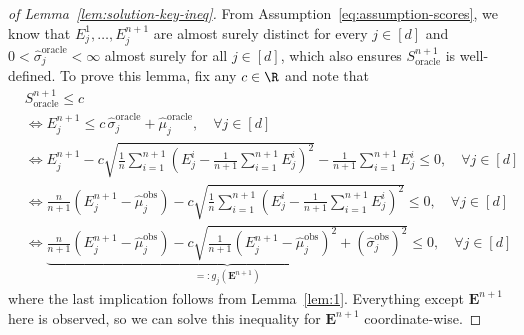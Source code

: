 \begin{proof}[of Lemma~\ref{lem:solution-key-ineq}]
From Assumption~\ref{eq:assumption-scores}, we know that $E^1_j,\dots, E^{n+1}_j$ are almost surely distinct for every $j \in [d]$ and $0<\hat{\sigma}^{\mathrm{oracle}}_j < \infty$ almost surely for all $j \in [d]$, which also ensures $S_{\mathrm{oracle}}^{n+1}$ is well-defined.
To prove this lemma, fix any $c \in \R$ and note that
\begin{align*}
    &S_{\mathrm{oracle}}^{n+1} \leq c \\
    &\iff E^{n+1}_j \leq c\,\hat{\sigma}^{\mathrm{oracle}}_j + \hat{\mu}^{\mathrm{oracle}}_j, \quad \forall j \in [d]\\
    &\iff {E^{n+1}_j - c\sqrt{\frac{1}{n}\sum^{n+1}_{i=1}\left(E^i_j -\frac{1}{n+1}\sum^{n+1}_{i=1}E^i_j \right)^2} - \frac{1}{n+1}\sum^{n+1}_{i=1}E^i_j} \leq 0, \quad \forall j \in [d]\\
    &\iff {\frac{n}{n+1}\left(E^{n+1}_j-\hat{\mu}^\mathrm{obs}_j\right) - c\sqrt{\frac{1}{n}\sum^{n+1}_{i=1}\left(E^i_j -\frac{1}{n+1}\sum^{n+1}_{i=1}E^i_j \right)^2}} \leq 0, \quad \forall j \in [d]\\
    &\iff \underbrace{\frac{n}{n+1}\left(E^{n+1}_j-\hat{\mu}^\mathrm{obs}_j\right) - c\sqrt{\frac{1}{n+1}\left(E^{n+1}_j-\hat{\mu}^\mathrm{obs}_j\right)^2+(\hat{\sigma}^\mathrm{obs}_j)^2}}_{=: g_j(\mathbf{E}^{n+1})} \leq 0, \quad \forall j \in [d]
\end{align*}
where the last implication follows from Lemma~\ref{lem:1}.
Everything except $\mathbf{E}^{n+1}$ here is observed, so we can solve this inequality for $\mathbf{E}^{n+1}$ coordinate-wise.


\end{proof}

